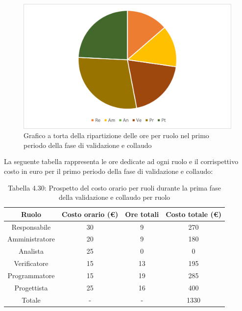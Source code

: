 \begin{figure}[H]
    \centering
    \includegraphics[scale=0.6]{img/grafi preventivo/torta/validazione/periodo1.png}
    \caption{Grafico a torta della ripartizione delle ore per ruolo nel primo periodo della fase di validazione e collaudo}
\end{figure}
La seguente tabella rappresenta le ore dedicate ad ogni ruolo e il corrispettivo costo in euro per il primo periodo della fase di validazione e collaudo:
\begin{table}[h]
	\setlength\extrarowheight{5pt}
	\centering
	\begin{tabularx}{\textwidth}{|ccc|c|}
		\hline
		\rowcolor{white}
		\textbf{Ruolo} & \textbf{Costo orario (€)} & \textbf{Ore totali} & \textbf{Costo totale (€)} \\
		\hline
		Responsabile &30&9&270 \\
		Amministratore &20&9&180 \\
		Analista &25&0&0 \\
		Verificatore &15&13&195 \\
		Programmatore &15&19&285 \\
		Progettista &25&16&400 \\
		\hline
		Totale &-&-&1330 \\
		\hline
	\end{tabularx}
    \vspace{10pt}
	\caption{Tabella 4.30: Prospetto del costo orario per ruoli durante la prima fase della validazione e collaudo per ruolo}
\end{table}
\newpage
